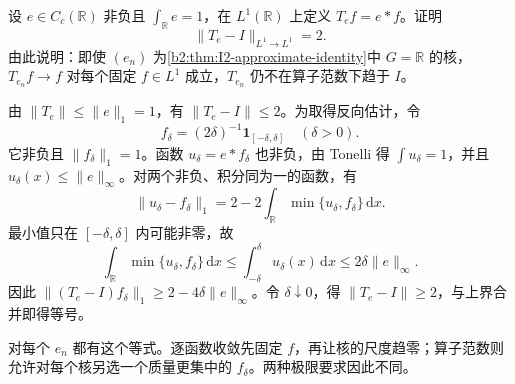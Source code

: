 \begin{exercise}[逼近恒等不作算子范数收敛]
\label{b2:ex:I2-no-operator-norm}
设 \(e\in C_c(\mathbb R)\) 非负且 \(\int_{\mathbb R}e=1\)，在 \(L^1(\mathbb R)\) 上定义 \(T_ef=e*f\)。证明
\[
 \|T_e-I\|_{L^1\to L^1}=2.
\]
由此说明：即使 \((e_n)\) 为\cref{b2:thm:I2-approximate-identity}中 \(G=\mathbb R\) 的核，\(T_{e_n}f\to f\) 对每个固定 \(f\in L^1\) 成立，\(T_{e_n}\) 仍不在算子范数下趋于 \(I\)。
\end{exercise}
\begin{solution}
由 \(\|T_e\|\le\|e\|_1=1\)，有 \(\|T_e-I\|\le2\)。为取得反向估计，令
\[
 f_\delta=(2\delta)^{-1}\mathbf1_{[-\delta,\delta]}
 \quad(\delta>0).
\]
它非负且 \(\|f_\delta\|_1=1\)。函数 \(u_\delta=e*f_\delta\) 也非负，由 Tonelli 得 \(\int u_\delta=1\)，并且 \(u_\delta(x)\le\|e\|_\infty\)。对两个非负、积分同为一的函数，有
\[
 \|u_\delta-f_\delta\|_1
 =2-2\int_{\mathbb R}\min\{u_\delta,f_\delta\}\,\mathrm dx.
\]
最小值只在 \([-\delta,\delta]\) 内可能非零，故
\[
 \int_{\mathbb R}\min\{u_\delta,f_\delta\}\,\mathrm dx
 \le\int_{-\delta}^{\delta}u_\delta(x)\,\mathrm dx
 \le2\delta\|e\|_\infty.
\]
因此 \(\|(T_e-I)f_\delta\|_1\ge2-4\delta\|e\|_\infty\)。令 \(\delta\downarrow0\)，得 \(\|T_e-I\|\ge2\)，与上界合并即得等号。

对每个 \(e_n\) 都有这个等式。逐函数收敛先固定 \(f\)，再让核的尺度趋零；算子范数则允许对每个核另选一个质量更集中的 \(f_\delta\)。两种极限要求因此不同。
\end{solution}


